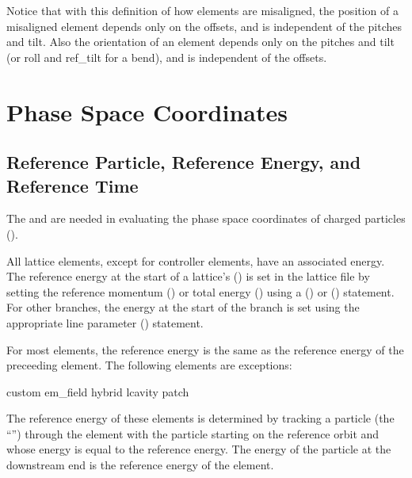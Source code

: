 Notice that with this definition of how elements are misaligned, the position of a misaligned
element depends only on the offsets, and is independent of the pitches and tilt. Also the
orientation of an element depends only on the pitches and tilt (or roll and ref_tilt for a bend),
and is independent of the offsets.

\section{Phase Space Coordinates}
\label{s:phase.coords}

\subsection{Reference Particle, Reference Energy, and Reference Time}
\label{s:ref.energy}

The  and  are needed in
evaluating the phase space coordinates of charged particles
().  

All lattice elements, except for controller elements, have an
associated  energy.  The reference energy at the
start of a lattice's  () is set in
the lattice file by setting the reference momentum () or total
energy () using a  () or
 () statement. For other branches, the
energy at the start of the branch is set using the appropriate line
parameter () statement.

For most elements, the reference energy is the same as the reference
energy of the preceeding element. The following elements are
exceptions:
\begin{example}
  custom
  em_field
  hybrid
  lcavity
  patch
\end{example}
The reference energy of these elements is determined by tracking a
particle (the ``'') through the element with the
particle starting on the reference orbit and whose energy is equal to
the reference energy.  The energy of the particle at the downstream
end is the reference energy of the element.

